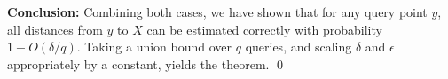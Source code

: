 \textbf{Conclusion:} Combining both cases, we have shown that for any query point $y$, all distances from $y$ to $X$ can be estimated correctly with probability $1-O(\delta/q)$. Taking a union bound over $q$ queries, and scaling $\delta$ and $\epsilon$ appropriately by a constant, yields the theorem. \qed